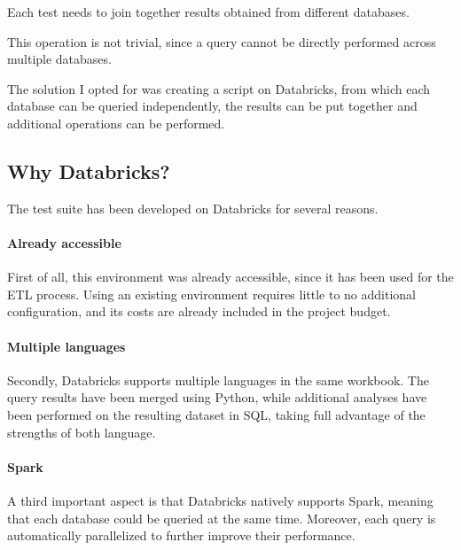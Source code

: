 Each test needs to join together results obtained from different databases.

This operation is not trivial, since a query cannot be directly performed across multiple databases.

The solution I opted for was creating a script on Databricks, from which each database can be queried independently, the results can be put together and additional operations can be performed.

\subsection{Why Databricks?}
   The test suite has been developed on Databricks for several reasons.
    
    \paragraph{Already accessible}
        First of all, this environment was already accessible, since it has been used for the ETL process.
        Using an existing environment requires little to no additional configuration, and its costs are already included in the project budget.
    
    \paragraph{Multiple languages}
        Secondly, Databricks supports multiple languages in the same workbook.
        The query results have been merged using Python, while additional analyses have been performed on the resulting dataset in SQL, taking full advantage of the strengths of both language.
    
    \paragraph{Spark}
        A third important aspect is that Databricks natively supports Spark, meaning that each database could be queried at the same time.
        Moreover, each query is automatically parallelized to further improve their performance.
    
